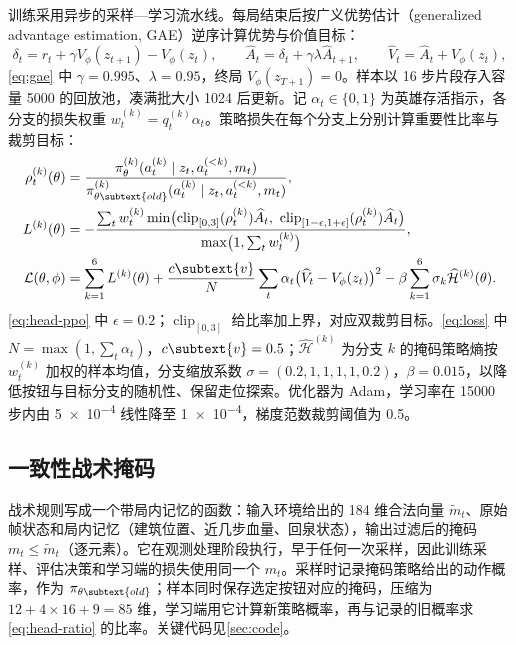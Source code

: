 训练采用异步的采样—学习流水线。每局结束后按广义优势估计（generalized advantage estimation, GAE）\cite{gae2016}逆序计算优势与价值目标：
\begin{equation}
  \delta_t=r_t+\gamma V_\phi(z_{t+1})-V_\phi(z_t),\qquad
  \widehat A_t=\delta_t+\gamma\lambda\widehat A_{t+1},\qquad
  \widehat V_t=\widehat A_t+V_\phi(z_t),
  \label{eq:gae}
\end{equation}
\cref{eq:gae} 中 $\gamma=0.995$、$\lambda=0.95$，终局 $V_\phi(z_{T+1})=0$。样本以 \num{16} 步片段存入容量 \num{5000} 的回放池，凑满批大小 \num{1024} 后更新。记 $\alpha_t\in\{0,1\}$ 为英雄存活指示，各分支的损失权重 $w_t^{(k)}=q_t^{(k)}\alpha_t$。策略损失在每个分支上分别计算重要性比率与裁剪目标\cite{ppo2017,ye2020mastering}：
\begin{align}
  \rho_t^{(k)}(\theta)&=\frac{\pi_\theta^{(k)}(a_t^{(k)}\mid z_t,a_t^{(<k)},m_t)}{\pi_{\theta\subtext{old}}^{(k)}(a_t^{(k)}\mid z_t,a_t^{(<k)},m_t)},
  \label{eq:head-ratio}\\
  L^{(k)}(\theta)&=-\frac{\sum_t w_t^{(k)}\min\bigl(\operatorname{clip}_{[0,3]}(\rho_t^{(k)})\widehat A_t,\ \operatorname{clip}_{[1-\epsilon,1+\epsilon]}(\rho_t^{(k)})\widehat A_t\bigr)}{\max\bigl(1,\sum_t w_t^{(k)}\bigr)},
  \label{eq:head-ppo}\\
  \mathcal L(\theta,\phi)&=\sum_{k=1}^{6}L^{(k)}(\theta)
  +\frac{c\subtext{v}}{N}\sum_t\alpha_t\bigl(\widehat V_t-V_\phi(z_t)\bigr)^2
  -\beta\sum_{k=1}^{6}\sigma_k\widehat{\mathcal H}^{(k)}(\theta).
  \label{eq:loss}
\end{align}
\cref{eq:head-ppo} 中 $\epsilon=0.2$；$\operatorname{clip}_{[0,3]}$ 给比率加上界，对应双裁剪目标\cite{ye2020mastering}。\cref{eq:loss} 中 $N=\max(1,\sum_t\alpha_t)$，$c\subtext{v}=0.5$；$\widehat{\mathcal H}^{(k)}$ 为分支 $k$ 的掩码策略熵按 $w_t^{(k)}$ 加权的样本均值，分支缩放系数 $\sigma=(0.2,1,1,1,1,0.2)$，$\beta=0.015$，以降低按钮与目标分支的随机性、保留走位探索。优化器为 Adam，学习率在 \num{15000} 步内由 \num{5e-4} 线性降至 \num{1e-4}，梯度范数裁剪阈值为 \num{0.5}。

\subsection{一致性战术掩码}
\label{sec:tactical-mask}

战术规则写成一个带局内记忆的函数：输入环境给出的 \num{184} 维合法向量 $\tilde m_t$、原始帧状态和局内记忆（建筑位置、近几步血量、回泉状态），输出过滤后的掩码 $m_t\le\tilde m_t$（逐元素）。它在观测处理阶段执行，早于任何一次采样，因此训练采样、评估决策和学习端的损失使用同一个 $m_t$。采样时记录掩码策略给出的动作概率，作为 $\pi_{\theta\subtext{old}}$；样本同时保存选定按钮对应的掩码，压缩为 $12+4\times16+9=85$ 维，学习端用它计算新策略概率，再与记录的旧概率求 \cref{eq:head-ratio} 的比率。关键代码见\cref{sec:code}。

